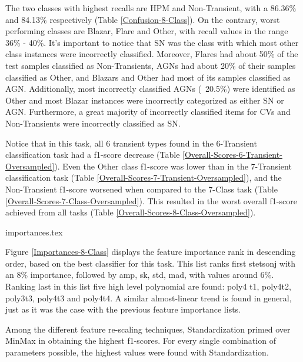 \documentclass[a4paper,fleqn,usenatbib]{mnras}
\begin{document}
The two classes with highest recalls are HPM and Non-Transient, with a 86.36\% and 84.13\% respectively (Table \ref{Confusion-8-Class}). On the contrary, worst performing classes are Blazar, Flare and Other, with recall values in the range 36\% - 40\%. It's important to notice that SN was the class with which most other class instances were incorrectly classified. Moreover, Flares had about 50\% of the test samples classified as Non-Transients, AGNs had about 20\% of their samples classified as Other, and Blazars and Other had most of  its samples classified as AGN. Additionally, most incorrectly classified AGNs (~20.5\%) were identified as Other and most Blazar instances were incorrectly categorized as either SN or AGN. Furthermore, a great majority of incorrectly classified items for CVs and Non-Transients were incorrectly classified as SN.

Notice that in this task, all 6 transient types found in the
6-Transient classification task had a f1-score decrease (Table
\ref{Overall-Scores-6-Transient-Oversampled}). Even the Other class
f1-score was lower than in the 7-Transient classification task (Table
\ref{Overall-Scores-7-Transient-Oversampled}), and the Non-Transient
f1-score worsened when compared to the 7-Class task (Table
\ref{Overall-Scores-7-Class-Oversampled}). This resulted in the worst
overall f1-score achieved from all tasks (Table
\ref{Overall-Scores-8-Class-Oversampled}). 


{importances.tex}

Figure \ref{Importances-8-Class} displays the feature importance rank
in descending order, based on the best classifier for this task.  
This list ranks first stetson\textunderscore j with an 8\% importance,
followed by amp, sk, std, mad, with values around 6\%. Ranking last in
this list five high level polynomial are found: poly4\textunderscore
t1,  poly4\textunderscore t2, poly3\textunderscore t3,
poly4\textunderscore t3 and poly4\textunderscore t4. A similar
almost-linear trend is found in general, just as it was the case with
the previous feature importance lists. 



Among the different feature re-scaling techniques, Standardization
primed over MinMax in obtaining the highest f1-scores. For every
single combination of parameters possible, the highest values were
found with Standardization. 
\end{document}
